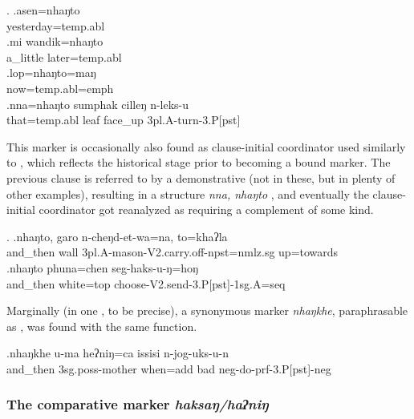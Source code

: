  \ex. \ag.asen=nhaŋto\\
 yesterday{\sc =temp.abl}\\
 \bg.mi wandik=nhaŋto\\
 a\_little later{\sc =temp.abl}\\
   \bg.lop=nhaŋto=maŋ\\
   now{\sc =temp.abl=emph}\\
\bg.nna=nhaŋto sumphak cilleŋ              n-leks-u\\
that{\sc =temp.abl} leaf face\_up {\sc 3pl.A-}turn{\sc -3.P[pst]}\\
  


This marker is occasionally also found as clause-initial coordinator used similarly to \Next, which reflects the historical stage prior to becoming a bound marker.  The previous clause is referred to by a demonstrative (not in these, but in plenty of other examples), resulting in a structure \emph{nna, nhaŋto} , and eventually  the clause-initial coordinator got reanalyzed as requiring a complement of some kind.

\ex. \ag.nhaŋto, garo n-cheŋd-et-wa=na,                            to=khaʔla\\
and\_then wall {\sc 3pl.A-}mason{\sc -V2.carry.off-npst=nmlz.sg} up=towards\\
 
\bg.nhaŋto phuna=chen            seg-haks-u-ŋ=hoŋ\\
and\_then white{\sc =top} choose{\sc -V2.send-3.P[pst]-1sg.A=seq}\\

Marginally (in one , to be precise),  a synonymous marker \emph{nhaŋkhe}, paraphrasable as , was found with the same function.

\exg.nhaŋkhe        u-ma              heʔniŋ=ca        issisi n-jog-uks-u-n\\
and\_then {\sc 3sg.poss-}mother when{\sc =add} bad {\sc neg-}do{\sc -prf-3.P[pst]-neg}\\
 

\subsubsection{The comparative marker \emph{haksaŋ/haʔniŋ}}
  
